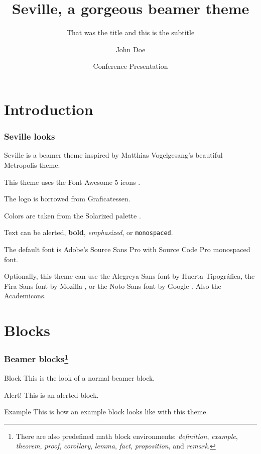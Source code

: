 \documentclass{beamer}
\title{Seville, a gorgeous beamer theme}
\subtitle{That was the title and this is the subtitle}
\author{John Doe}
\date{Conference Presentation \the\year{}}
\institute{University of \LaTeX}
\begin{document}
\begin{frame}

    \titlepage

\end{frame}

\section{Introduction}

\begin{frame}
    \frametitle{Seville looks}

    Seville is a beamer theme inspired by Matthias Vogelgesang's beautiful Metropolis theme.

    This theme uses the Font Awesome 5 icons \faFontAwesome{}.

    The logo is borrowed from Graficatessen.

    Colors are taken from the Solarized palette \faPalette.

    Text can be \alert{alerted}, \textbf{bold}, \emph{emphasized}, or \texttt{monospaced}.

    The default font is Adobe's Source Sans Pro with Source Code Pro monospaced font.

    Optionally, this theme can use the Alegreya Sans font by Huerta Tipográfica, the Fira Sans font by Mozilla \faFirefox, or the Noto Sans font by Google \faGoogle. Also the Academicons.

\end{frame}

\section{Blocks}

\begin{frame}
    \frametitle{Beamer blocks\footnote{There are also predefined math block environments: \emph{definition}, \emph{example}, \emph{theorem}, \emph{proof}, \emph{corollary}, \emph{lemma}, \emph{fact}, \emph{proposition}, and \emph{remark}.}}

    \begin{block}{Block}
        This is the look of a normal beamer block.
    \end{block}

    \begin{alertblock}{Alert!}
        This is an alerted block.
    \end{alertblock}

    \begin{exampleblock}{Example}
        This is how an example block looks like with this theme.
    \end{exampleblock}

\end{frame}
\end{document}
